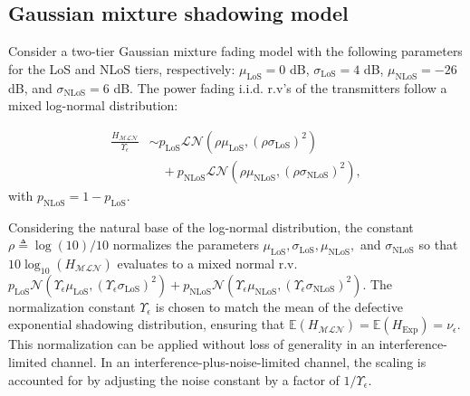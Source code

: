 \documentclass[lettersize,journal]{IEEEtran}
\begin{document}
\subsection{Gaussian mixture shadowing model}

Consider a two-tier Gaussian mixture fading model with the following parameters for the LoS and NLoS tiers, respectively: $\mu_{\text{LoS}} = 0$ dB, $\sigma_{\text{LoS}} = 4$ dB, $\mu_{\text{NLoS}} = -26$ dB, and $\sigma_{\text{NLoS}} = 6$ dB. The power fading i.i.d. r.v's of the transmitters follow a mixed log-normal distribution:

\begin{align}
  \label{eq:tier2lognormal}
  \frac{H_{\mathcal{M}\mathcal{L}\mathcal{N}}}{\Upsilon_{\epsilon}} &\sim p_{\text{LoS}} \mathcal{L}\mathcal{N}(\rho \mu_{\text{LoS}}, (\rho \sigma_{\text{LoS}})^2) \nonumber \\
  &\quad + p_{\text{NLoS}} \mathcal{L}\mathcal{N}(\rho \mu_{\text{NLoS}}, (\rho \sigma_{\text{NLoS}})^2),
\end{align}
with $p_{\text{NLoS}} = 1 - p_{\text{LoS}}$.

Considering the natural base of the log-normal distribution, the constant $\rho \triangleq \log(10)/10$ normalizes the parameters $\mu_{\text{LoS}}, \sigma_{\text{LoS}}, \mu_{\text{NLoS}},$ and $\sigma_{\text{NLoS}}$ so that $10 \log_{10}(H_{\mathcal{M}\mathcal{L} \mathcal{N}})$ evaluates to a mixed normal r.v. $p_{\text{LoS}} \mathcal{N}(\Upsilon_{\epsilon}\mu_{\text{LoS}}, (\Upsilon_{\epsilon}\sigma_{\text{LoS}})^2) + p_{\text{NLoS}} \mathcal{N}(\Upsilon_{\epsilon} \mu_{\text{NLoS}}, (\Upsilon_{\epsilon}\sigma_{\text{NLoS}})^2)$. The normalization constant $\Upsilon_{\epsilon}$ is chosen to match the mean of the defective exponential shadowing distribution, ensuring that $\mathbb{E}(H_{\mathcal{M}\mathcal{L}\mathcal{N}}) = \mathbb{E}(H_{\text{Exp}}) = \nu_{\epsilon}$. This normalization can be applied without loss of generality in an interference-limited channel. In an interference-plus-noise-limited channel, the scaling is accounted for by adjusting the noise constant by a factor of $1/\Upsilon_{\epsilon}$.
\end{document}
